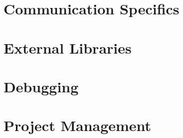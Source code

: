\section{Communication Specifics}
\section{External Libraries}
\section{Debugging}
\section{Project Management}